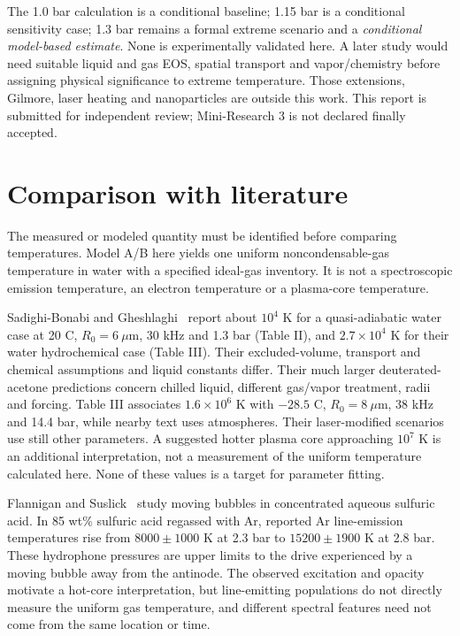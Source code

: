 \documentclass[10pt,a4paper]{article}
\begin{document}
The 1.0 bar calculation is a conditional baseline; 1.15 bar is a conditional sensitivity case; 1.3 bar remains a formal extreme scenario and a \emph{conditional model-based estimate}. None is experimentally validated here. A later study would need suitable liquid and gas EOS, spatial transport and vapor/chemistry before assigning physical significance to extreme temperature. Those extensions, Gilmore, laser heating and nanoparticles are outside this work. This report is submitted for independent review; Mini-Research 3 is not declared finally accepted.

\newpage
\section{Comparison with literature}
The measured or modeled quantity must be identified before comparing temperatures. Model A/B here yields one uniform noncondensable-gas temperature in water with a specified ideal-gas inventory. It is not a spectroscopic emission temperature, an electron temperature or a plasma-core temperature.

Sadighi-Bonabi and Gheshlaghi~\cite{sadighi} report about $10^4$ K for a quasi-adiabatic water case at 20 C, $R_0=6\ \mu$m, 30 kHz and 1.3 bar (Table II), and $2.7\times10^4$ K for their water hydrochemical case (Table III). Their excluded-volume, transport and chemical assumptions and liquid constants differ. Their much larger deuterated-acetone predictions concern chilled liquid, different gas/vapor treatment, radii and forcing. Table III associates $1.6\times10^6$ K with $-28.5$ C, $R_0=8\ \mu$m, 38 kHz and 14.4 bar, while nearby text uses atmospheres. Their laser-modified scenarios use still other parameters. A suggested hotter plasma core approaching $10^7$ K is an additional interpretation, not a measurement of the uniform temperature calculated here. None of these values is a target for parameter fitting.

Flannigan and Suslick~\cite{flannigan} study moving bubbles in concentrated aqueous sulfuric acid. In 85 wt\% sulfuric acid regassed with Ar, reported Ar line-emission temperatures rise from $8000\pm1000$ K at 2.3 bar to $15200\pm1900$ K at 2.8 bar. These hydrophone pressures are upper limits to the drive experienced by a moving bubble away from the antinode. The observed excitation and opacity motivate a hot-core interpretation, but line-emitting populations do not directly measure the uniform gas temperature, and different spectral features need not come from the same location or time.
\end{document}
